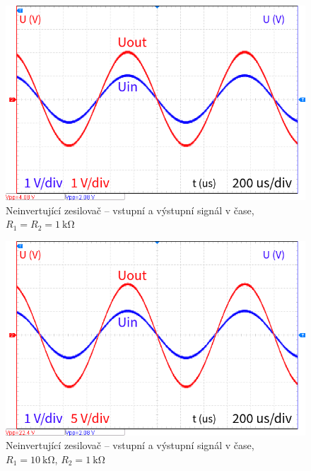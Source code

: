 \documentclass{protokol}
\begin{document}
\begin{figure}[h!]
	\centering
	\includegraphics[width=\textwidth]{oscilo/output5.png}
	\centering
	\caption{Neinvertující zesilovač -- vstupní a výstupní signál v čase, $R_1=R_2=\SI{1}{\kilo\ohm}$}
	\label{fig:ni-l-prenos-1k}
\end{figure}

\begin{figure}[h!]
	\centering
	\includegraphics[width=\textwidth]{oscilo/output6.png}
	\centering
	\caption{Neinvertující zesilovač -- vstupní a výstupní signál v čase, $R_1=\SI{10}{\kilo\ohm}$, $R_2=\SI{1}{\kilo\ohm}$}
	\label{fig:ni-l-prenos-10k}
\end{figure}
\end{document}
